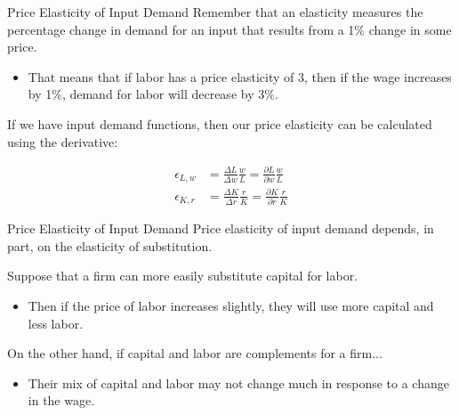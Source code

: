 \documentclass[11pt,t]{beamer}
\begin{document}
\begin{frame}{Price Elasticity of Input Demand}
  Remember that an elasticity measures the percentage change in demand for an input that results from a 1\% change in some price.

  \begin{itemize}
    \item That means that if labor has a price elasticity of $3$, then if the wage increases by 1\%, demand for labor will decrease by $3\%$.
  \end{itemize}
  
  \pause\bigskip
  If we have input demand functions, then our price elasticity can be calculated using the derivative:

  \vspace*{-5mm}
  \begin{align*}
    \epsilon_{L,w} &= \frac{\Delta L}{\Delta w}\frac{w}{L} = \frac{\partial L}{\partial w}\frac{w}{L} \\
    \epsilon_{K,r} &= \frac{\Delta K}{\Delta r}\frac{r}{K} = \frac{\partial K}{\partial r}\frac{r}{K}
  \end{align*}
\end{frame}

\begin{frame}{Price Elasticity of Input Demand}
  Price elasticity of input demand depends, in part, on the elasticity of substitution.

  \bigskip 
  Suppose that a firm can more easily substitute capital for labor.
  \begin{itemize}
    \item Then if the price of labor increases slightly, they will use more capital and less labor.
  \end{itemize}

  \pause\bigskip
  On the other hand, if capital and labor are complements for a firm...
  \begin{itemize}
    \item Their mix of capital and labor may not change much in response to a change in the wage.
  \end{itemize}
\end{frame}
\end{document}
